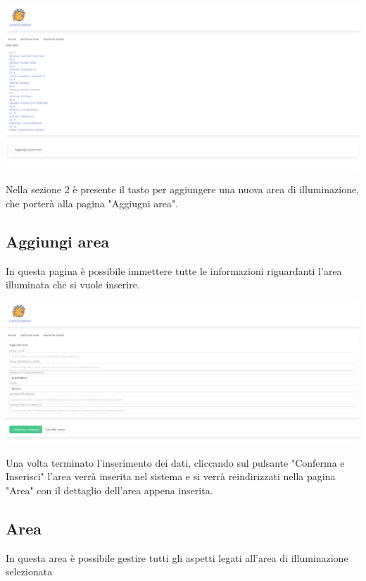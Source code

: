 \documentclass[9pt]{article}
\begin{document}
\begin{center}
	\includegraphics[scale=0.3]{Gestione_aree.png}
\end{center}

Nella sezione 2 è presente il tasto per aggiungere una nuova area di illuminazione, che porterà alla pagina "Aggiugni area". 

\subsection{Aggiungi area}

In questa pagina è possibile immettere tutte le informazioni riguardanti l'area illuminata che si vuole inserire.

\begin{center}
	\includegraphics[scale=0.3]{Aggiungi_area.png}
\end{center}	

Una volta terminato l'inserimento dei dati, cliccando sul pulsante "Conferma e Inserisci" 
l'area verrà inserita nel sistema e si verrà reindirizzati nella pagina "Area" con il dettaglio dell'area appena inserita.

\subsection{Area}

In questa area è possibile gestire tutti gli aspetti legati all'area di illuminazione selezionata
\end{document}
